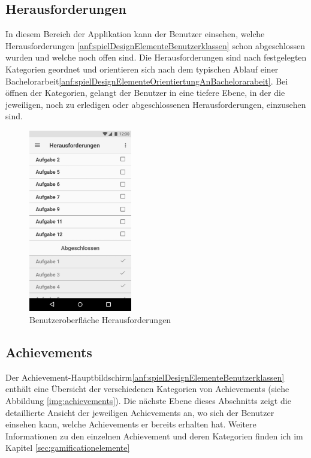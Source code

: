 \documentclass{scrreprt}
\begin{document}
\newpage
\subsection{Herausforderungen}
\par In diesem Bereich der Applikation kann der Benutzer einsehen, welche Herausforderungen \ref{anf:spielDesignElementeBenutzerklassen} schon abgeschlossen wurden und welche noch offen sind. Die Herausforderungen sind nach festgelegten Kategorien geordnet und orientieren sich nach dem typischen Ablauf einer Bachelorarbeit\ref{anf:spielDesignElementeOrientiertungAnBachelorarabeit}. Bei öffnen der Kategorien, gelangt der Benutzer in eine tiefere Ebene, in der die jeweiligen, noch zu erledigen oder abgeschlossenen Herausforderungen, einzusehen sind.

\begin{figure}[H]
	\centering
	\includegraphics[width=0.4\textwidth, keepaspectratio]{Bilder/Prototyp/AufgabenSortiert.jpg}
	\caption{Benutzeroberfläche Herausforderungen}
	\label{img:aufgaben}
\end{figure}

\newpage
\subsection{Achievements}
\par Der Achievement-Hauptbildschirm\ref{anf:spielDesignElementeBenutzerklassen} enthält eine Übersicht der verschiedenen Kategorien von Achievements (siehe Abbildung \ref{img:achievements}). Die nächste Ebene dieses Abschnitts zeigt die detaillierte Ansicht der jeweiligen Achievements an, wo sich der Benutzer einsehen kann, welche Achievements er bereits erhalten hat. Weitere Informationen zu den einzelnen Achievement und deren Kategorien finden ich im Kapitel \ref{sec:gamificationelemente}\\
\end{document}

